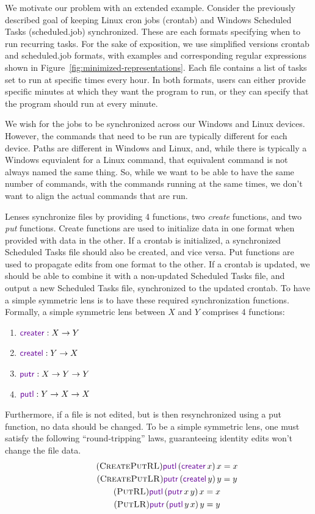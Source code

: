 \documentclass[acmsmall,screen,anonymous]{acmart}
\begin{document}
We motivate our problem with an extended example. Consider the previously
described goal of keeping Linux cron jobs (crontab) and Windows Scheduled Tasks
(scheduled.job) synchronized. These are each formats specifying when to run
recurring tasks. For the sake of exposition, we use simplified versions crontab
and scheduled.job formats, with examples and corresponding regular expressions
shown in Figure~\ref{fig:minimized-representations}. Each file contains a list
of tasks set to run at specific times every hour. In both formats, users
can either provide specific minutes at which they want the program to run, or they
can specify that the program should run at every minute.

We wish for the jobs to be synchronized across our Windows and Linux devices.
However, the commands that need to be run are typically different for each
device. Paths are different in Windows and Linux, and, while there is typically a
Windows equvialent for a Linux command, that equivalent command is not always
named the same thing. So, while we want to be able to have the same number of
commands, with the commands running at the same times, we don't want to
align the actual commands that are run.

Lenses synchronize files by providing 4 functions, two \emph{create} functions,
and two \emph{put} functions. Create functions are used to initialize data in
one format when provided with data in the other. If a crontab is initialized, a
synchronized Scheduled Tasks file should also be created, and vice versa. Put
functions are used to propagate edits from one format to the other. If a crontab
is updated, we should be able to combine it with a non-updated Scheduled Tasks
file, and output a new Scheduled Tasks file, synchronized to the updated
crontab. To have a simple symmetric lens is to have these required
synchronization functions. Formally, a simple symmetric lens between $X$ and $Y$
comprises 4 functions:
\begin{enumerate}
\item $\CreateR \OfType X \rightarrow Y$
\item $\CreateL \OfType Y \rightarrow X$
\item $\PutR \OfType X \rightarrow Y \rightarrow Y$
\item $\PutL \OfType Y \rightarrow X \rightarrow X$
\end{enumerate}
Furthermore, if a file is not edited, but is then resynchronized using a put
function, no data should be changed. To be a simple symmetric lens, one must
satisfy the following ``round-tripping'' laws, guaranteeing identity edits won't
change the file data.
\begin{gather}
  \tag{\CreatePutRL}
  \PutLOf{(\CreateROf{x})}{x} = x\\
  \tag{\CreatePutLR}
  \PutROf{(\CreateLOf{y})}{y} = y\\
  \tag{\PutRL}
  \PutLOf{(\PutROf{x}{y})}{x} = x\\
  \tag{\PutLR}
  \PutROf{(\PutLOf{y}{x})}{y} = y
\end{gather}
\end{document}
